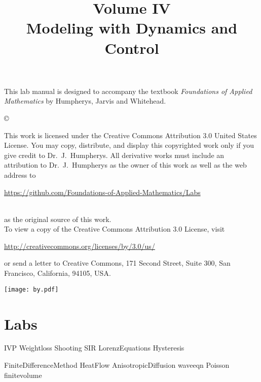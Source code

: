 \documentclass[opener-c,labs,green,nociteref]{HJnewsiambook}
\title{Volume IV\\ Modeling with Dynamics and Control}
\begin{document}

\thispagestyle{empty} %
\maketitle
\thispagestyle{empty}
\frontmatter



\begin{thepreface} %

This lab manual is designed to accompany the textbook \emph{Foundations of Applied Mathematics} by Humpherys, Jarvis and Whitehead.

\vfill
\copyright{This work is licensed under the Creative Commons Attribution 3.0 United States
License.  You may copy, distribute, and display this copyrighted work only if you give
credit to Dr.~J.~Humpherys. All derivative works must include an attribution to Dr.~J.~Humpherys as the owner of this work as well as the web address to
\\\centerline{\url{https://github.com/Foundations-of-Applied-Mathematics/Labs}}\\as the original source of this work.
\\To view a copy of the Creative Commons Attribution 3.0 License, visit
\\\centerline{\url{http://creativecommons.org/licenses/by/3.0/us/}} or send a letter to Creative Commons, 171 Second Street, Suite 300, San Francisco, California, 94105, USA.}

\vfill
\centering\texttt{[image: by.pdf]}
\vfill
\end{thepreface}

\setcounter{tocdepth}{1}
\tableofcontents

\mainmatter %

\part{Labs}
{IVP}
{Weightloss}
{Shooting}
{SIR}
{LorenzEquations}
{Hysteresis}

{FiniteDifferenceMethod}
{HeatFlow}
{AnisotropicDiffusion}
{waveeqn}
{Poisson}
{finitevolume}
\end{document}

